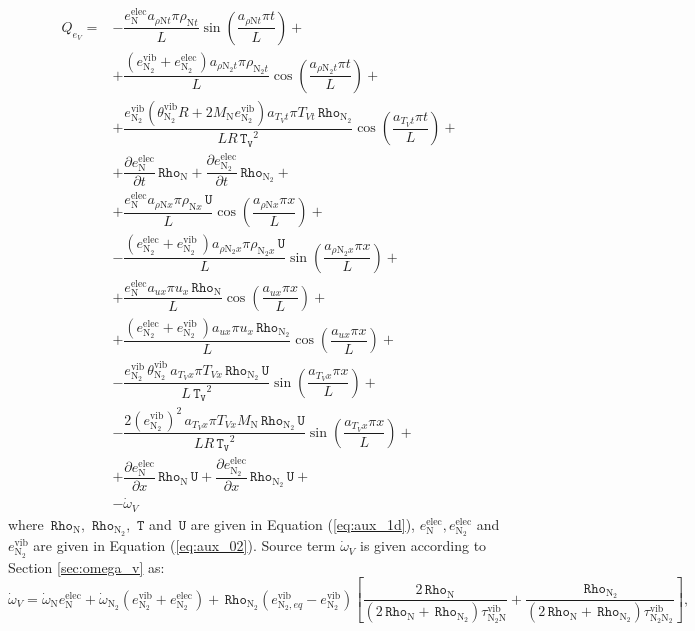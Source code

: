 \documentclass[10pt]{article}
\newcommand{\diff}[2] {\dfrac{\partial #1 }{\partial #2}}
\newcommand{\Rho}{\,\mathtt{Rho}}
\newcommand{\T}{\,\mathtt{T}}
\newcommand{\U}{\,\mathtt{U}}
\newcommand{\TV}{\,\mathtt{T_V}}
\newcommand{\N}{\text{N}}
\newcommand{\elec}{\text{elec}}
\newcommand{\vib}{\text{vib}}
\begin{document}
\begin{equation}
\begin{split}\label{eq:source_eV}
Q_{e_V} =& -\dfrac{e_{\N}^{\elec} a_{\rho \N t} \pi \rho_{\N t} }{L} \sin\left(\dfrac{a_{\rho \N t} \pi t}{L}\right)+\\ 
&+\dfrac{(e_{\N_2}^{\vib}+e_{\N_2}^{\elec}) a_{\rho \N_2 t} \pi \rho_{\N_2 t} }{L}\cos\left(\dfrac{a_{\rho \N_2 t} \pi t}{L}\right) +\\ 
&+\dfrac{ e_{\N_2}^{\vib}(\theta^{\vib}_{\N_2} R+2 M_\N e_{\N_2}^{\vib}) a_{T_V t} \pi T_{Vt} \Rho_{\N_2} }{L R \TV^2} \cos\left(\dfrac{a_{T_V t} \pi t}{L}\right)+\\ 
&+\diff{e_{\N}^{\elec}}{t}  \Rho_{\N}+\diff{e_{\N_2}^{\elec}}{t}  \Rho_{\N_2}+\\ 
%
&+ \dfrac{e_{\N}^{\elec} a_{  \rho \N x } \pi \rho_{\N x} \U }{L} \cos\left(\dfrac{a_{  \rho \N x } \pi x}{L}\right) +\\ 
&- \dfrac{(e_{\N_2}^{\elec}+e_{\N_2}^{\vib} \, ) a_{  \rho \N_2 x } \pi \rho_{\N_2 x} \U }{L} \sin\left(\dfrac{a_{  \rho \N_2 x } \pi x}{L}\right)  +\\ 
&+ \dfrac{e_{\N}^{\elec} a_{ux} \pi u_x \Rho_{\N} }{L} \cos\left(\dfrac{a_{ux} \pi x}{L}\right)+\\ 
&+ \dfrac{(e_{\N_2}^{\elec}+e_{\N_2}^{\vib} \, ) a_{ux} \pi u_x \Rho_{\N_2} }{L}\cos\left(\dfrac{a_{ux} \pi x}{L}\right)  +\\ 
&-\dfrac{e_{\N_2}^{\vib} \, \theta^{\vib}_{\N_2} \, a_{T_V x} \pi T_{Vx}   \Rho_{\N_2} \U}{L \TV^2} \sin\left(\dfrac{a_{T_V x} \pi x}{L}\right) +\\
&-\dfrac{2 (e_{\N_2}^{\vib})^2 \, a_{T_V x} \pi T_{Vx} M_\N \Rho_{\N_2} \U }{L R \TV^2}\sin\left(\dfrac{a_{T_V x} \pi x}{L}\right) +\\
&+\diff{e_{\N}^{\elec}}{x} \Rho_{\N} \U+\diff{e_{\N_2}^{\elec}}{x} \Rho_{\N_2} \U +\\
&- \dot{\omega}_V
\end{split}
\end{equation}
%
where   $\Rho_{\text{N}},\,\Rho_{\text{N}_2},\, \T$ and $\U$ are given  in Equation (\ref{eq:aux_1d}),   $e_{\N}^{\elec}, e_{\N_2}^{\elec}$ and $e_{\N_2}^{\vib}  $ are given in Equation (\ref{eq:aux_02}). Source term  $\dot{\omega}_V$ is given according to Section \ref{sec:omega_v} as:
$$\dot{\omega}_V = \dot{\omega}_\N e_{\N}^{\elec} + \dot{\omega}_{\N_2} (e_{\N_2}^{\vib}+e_{\N_2}^{\elec})+\Rho_{\N_2} (e_{\N_2,eq}^{\vib}-e_{\N_2}^{\vib}) \left[\dfrac{2 \Rho_{\N}}{(2 \Rho_{\N}+\Rho_{\N_2}) \tau^{\vib}_{\N_2\N}}+\dfrac{\Rho_{\N_2}}{(2 \Rho_{\N}+\Rho_{\N_2}) \tau^{\vib}_{\N_2\N_2}}\right],$$
\end{document}
